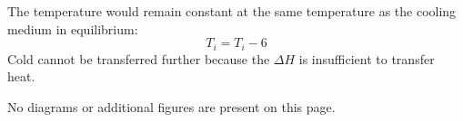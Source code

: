 The temperature would remain constant at the same temperature as the cooling medium in equilibrium:  
\[
T_i = T_i - 6
\]  
Cold cannot be transferred further because the \( \Delta H \) is insufficient to transfer heat.  

No diagrams or additional figures are present on this page.
